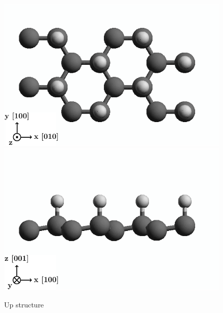 \documentclass[twocolumn]{article}
\begin{document}
\begin{figure}[h!]
    \centering
    \includegraphics[width=\linewidth]{figures/upstruc1}
    \includegraphics[width=\linewidth]{figures/upstruc2}
    \caption{Up structure}
    \label{fig:upstruc}
\end{figure}

\textcolor{red}{
\blindtext
\blindtext
\blindtext
}
\end{document}
